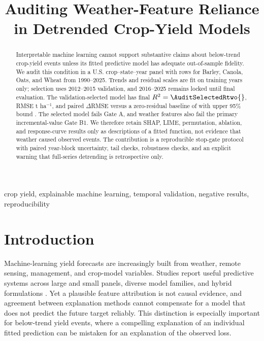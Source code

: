 \documentclass[conference]{IEEEtran}
\title{Auditing Weather-Feature Reliance in Detrended Crop-Yield Models}
\author{\IEEEauthorblockN{Anonymous Submission}}
\begin{document}
\maketitle

\begin{abstract}
Interpretable machine learning cannot support substantive claims about below-trend
crop-yield events unless its fitted predictive model has adequate out-of-sample
fidelity. We audit this condition in a U.S. crop--state--year panel with
\AuditTotalRows{} rows for Barley, Canola, Oats, and Wheat from 1990--2025.
Trends and residual scales are fit on training years only; selection uses
2012--2015 validation, and 2016--2025 remains locked until final evaluation. The
validation-selected \AuditSelectedModel{} \AuditSelectedFamily{} model has final
$R^2=\AuditSelectedRtwo{}$, RMSE \AuditSelectedRMSE{} t ha$^{-1}$, and paired
$\Delta$RMSE versus a zero-residual baseline of \AuditSelectedDeltaRMSE{} with
upper 95\% bound \AuditSelectedDeltaHigh{}. The selected model fails Gate A, and
weather features also fail the primary incremental-value Gate B1. We therefore
retain SHAP, LIME, permutation, ablation, and response-curve results only as
descriptions of a fitted function, not evidence that weather caused observed
events. The contribution is a reproducible stop-gate protocol with paired
year-block uncertainty, tail checks, robustness checks, and an explicit warning
that full-series detrending is retrospective only.
\end{abstract}

\begin{IEEEkeywords}
crop yield, explainable machine learning, temporal validation, negative results,
reproducibility
\end{IEEEkeywords}

\section{Introduction}
Machine-learning yield forecasts are increasingly built from weather, remote
sensing, management, and crop-model variables. Studies report useful predictive
systems across large and small panels, diverse model families, and hybrid
formulations \cite{Paudel2021,Meroni2021,Khaki2019,LengHall2020,Klompenburg2020,Chlingaryan2018,Shahhosseini2021}.
Yet a plausible feature attribution is not causal evidence, and agreement between
explanation methods cannot compensate for a model that does not predict the future
target reliably. This distinction is especially important for below-trend yield
events, where a compelling explanation of an individual fitted prediction can be
mistaken for an explanation of the observed loss.
\end{document}
